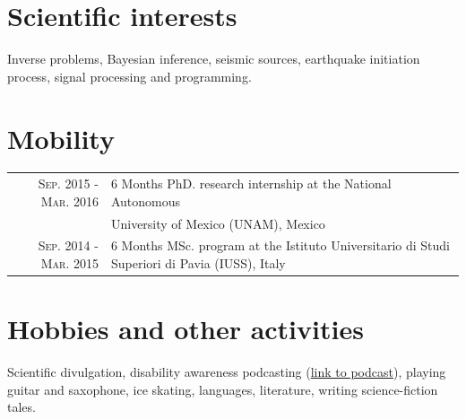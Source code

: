 \documentclass[a4paper]{article} %
\begin{document}
\vskip 0.2cm
\section{Scientific interests}

Inverse problems, Bayesian inference, seismic sources, earthquake initiation process, signal processing and programming.

\vskip 0.2cm
\section{Mobility}
\begin{tabular}{rp{11cm}}
{ \textsc{Sep. 2015 - Mar. 2016 }} & 6 Months PhD. research internship at the National Autonomous \\
				     & University of Mexico (UNAM), Mexico  \\
{ \textsc{Sep. 2014 - Mar. 2015 }} & 6 Months MSc. program at the Istituto Universitario di Studi Superiori di Pavia (IUSS), Italy  \\[0.6em] 
\end{tabular}


\vskip 0.2cm
\section{Hobbies and other activities}

Scientific divulgation, disability awareness podcasting (\href{https://podcasts.google.com/feed/aHR0cHM6Ly9hbmNob3IuZm0vcy8xZjQ3MjU0Yy9wb2RjYXN0L3Jzcw==}{link to podcast}),
playing guitar and saxophone, ice skating, languages, literature, writing science-fiction tales.
\end{document}
